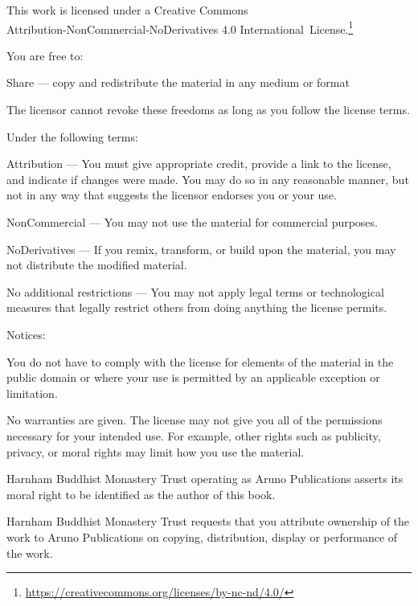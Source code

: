 \cleartorecto
\thispagestyle{plain}

{\fontsize{9.5}{13.5}\selectfont%
\setlength{\parindent}{0pt}%
\raggedright\label{copyright-details}%
\setlength{\parskip}{7pt}%

{\centering

{\LARGE\ccbyncnd}

This work is licensed under a Creative Commons\\
Attribution-NonCommercial-NoDerivatives 4.0 International~License.\footnote{%
\href{https://creativecommons.org/licenses/by-nc-nd/4.0/}{https://creativecommons.org/licenses/by-nc-nd/4.0/}}

}

You are free to:

\begin{packeditemize}
\item Share — copy and redistribute the material in any medium or format
\end{packeditemize}

The licensor cannot revoke these freedoms as long as you follow the license terms.

Under the following terms:

\begin{packeditemize}
\item Attribution — You must give appropriate credit, provide a link to the license, and indicate if changes were made. You may do so in any reasonable manner, but not in any way that suggests the licensor endorses you or your use.
\item NonCommercial — You may not use the material for commercial purposes.
\item NoDerivatives — If you remix, transform, or build upon the material, you may not distribute the modified material.
\end{packeditemize}

No additional restrictions — You may not apply legal terms or technological measures that legally restrict others from doing anything the license permits.

Notices:

You do not have to comply with the license for elements of the material in the public domain or where your use is permitted by an applicable exception or limitation.

No warranties are given. The license may not give you all of the permissions necessary for your intended use. For example, other rights such as publicity, privacy, or moral rights may limit how you use the material.

Harnham Buddhist Monastery Trust operating as Aruno Publications asserts its moral right to be identified as the author of this book.

Harnham Buddhist Monastery Trust requests that you attribute ownership of the work to Aruno Publications on copying, distribution, display or performance of the work.

}
